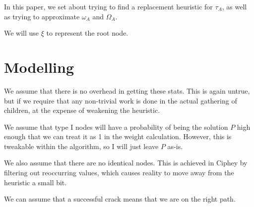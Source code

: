 \documentclass{article}
\theoremstyle{definition}
\begin{document}
In this paper, we set about trying to find a replacement heuristic for $\tau_A$, as well as trying to approximate $\omega_A$ and $\Omega_A$.

We will use $\xi$ to represent the root node.

\section{Modelling}

We assume that there is no overhead in getting these stats. This is again untrue,
but if we require that any non-trivial work is done in the actual gathering of 
children, at the expense of weakening the heuristic.

We assume that type I nodes will have a probability of being the solution $P$ high
enough that we can treat it as 1 in the weight calculation. However, this is tweakable within the algorithm, so I will just leave $P$ as-is.

We also assume that there are no identical nodes. This is achieved in Ciphey by
filtering out reoccurring values, which causes reality to move away from the
heuristic a small bit.

We can assume that a successful crack means that we are on the right path.
\end{document}

